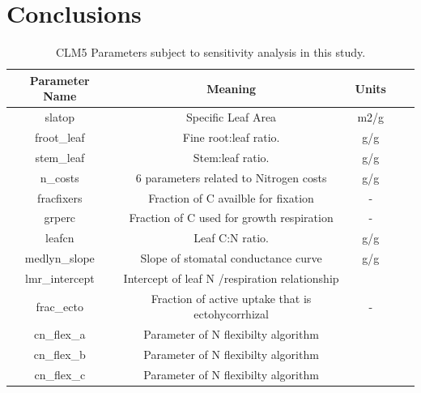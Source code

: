\documentclass[draft,linenumbers]{agujournal}
\begin{document}
\section{Conclusions}




\nocite{*}

\clearpage


\pagebreak
\begin{table}
\begin{center}
\begin{tabular}{ |c|c|c|c|c| } 
 \hline
 Parameter Name & Meaning & Units \\
  \hline
 slatop & Specific Leaf Area & m2/g \\ 
 froot\_leaf & Fine root:leaf ratio. & g/g \\
 stem\_leaf  & Stem:leaf ratio. & g/g \\ 
 n\_costs    & 6 parameters related to Nitrogen costs & g/g \\
 fracfixers  & Fraction of C availble for fixation & - \\
  grperc  & Fraction of C used for growth respiration  & - \\
  leafcn  & Leaf C:N ratio. & g/g \\
     medlyn\_slope  & Slope of stomatal conductance curve & g/g \\
      lmr\_intercept & Intercept of leaf N /respiration relationship & \\
      frac\_ecto & Fraction of active uptake that is ectohycorrhizal & - \\
      cn\_flex\_a & Parameter of N flexibilty algorithm& \\
      cn\_flex\_b & Parameter of N flexibilty algorithm & \\
      cn\_flex\_c & Parameter of N flexibilty algorithm & \\
\hline
\end{tabular}
\end{center}
\caption{CLM5 Parameters subject to sensitivity analysis in this study. }
\label{table_parameters}
\end{table}
\end{document}
